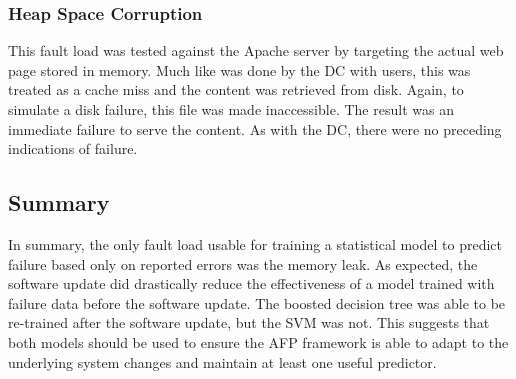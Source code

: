 \subsubsection{Heap Space Corruption}
This fault load was tested against the Apache server by targeting the actual
web page stored in memory.  Much like was done by the \ac{DC} with users, this
was treated as a cache miss and the content was retrieved from disk.  Again, to
simulate a disk failure, this file was made inaccessible.  The result was an
immediate failure to serve the content.  As with the \ac{DC}, there were no
preceding indications of failure.

\subsection{Summary}
In summary, the only fault load usable for training a statistical model to
predict failure based only on reported errors was the memory leak.  As
expected, the software update did drastically reduce the effectiveness of a
model trained with failure data before the software update.  The boosted
decision tree was able to be re-trained after the software update, but the
\ac{SVM} was not.  This suggests that both models should be used to ensure the
\ac{AFP} framework is able to adapt to the underlying system changes and
maintain at least one useful predictor.
